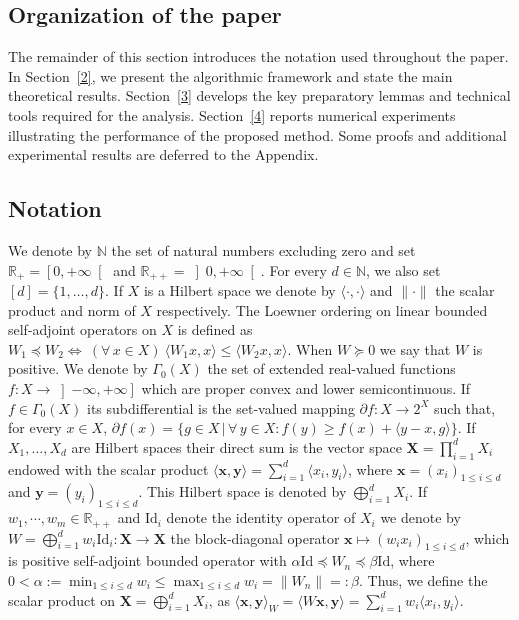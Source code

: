 \documentclass[11pt]{article}
\theoremstyle{plain}
\theoremstyle{definition}
\theoremstyle{remark}
\newcommand{\norm}[1]{\lVert{#1}\rVert}
\newcommand{\scalarp}[1]{\langle{#1}\rangle}
\newcommand{\HH}{X}
\newcommand{\bHH}{\bm{X}}
\newcommand{\R}{\mathbb{R}}
\newcommand{\Sb}{\mathbb{S}}
\newcommand{\x}{x}
\newcommand{\m}{d}
\newcommand{\bx}{\bm{x}}
\newcommand{\by}{\bm{y}}
\newcommand{\y}{y}
\newcommand{\uu}{g}
\newcommand{\w}{w}
\newcommand{\iter}{n}
\newcommand{\N}{\mathbb{N}}
\newcommand{\RX}{\left]-\infty, +\infty\right]}
\newcommand{\Id}{\mathrm{Id}}
\newcommand{\W}{W}
\begin{document}
\subsection{Organization of the paper}

The remainder of this section introduces the notation used throughout the paper. In Section~\ref{2}, we present the algorithmic framework and state the main theoretical results. Section~\ref{3} develops the key preparatory lemmas and technical tools required for the analysis. Section~\ref{4} reports numerical experiments illustrating the performance of the proposed method. Some proofs and additional experimental results are deferred to the Appendix.
\subsection{Notation}

We denote by $\N$ the set of natural numbers excluding zero and set
$\R_+ = \left[0,+\infty\right[$ and $\R_{++} = \left]0,+\infty\right[$.
For every $\m\in \N$, we also set $[\m]= \{1,\dots, \m\}$. If $\HH$
is a Hilbert space we denote by $\scalarp{\cdot, \cdot}$ and $\norm{\cdot}$
the scalar product and norm of $\HH$ respectively. 
The Loewner ordering on linear bounded self-adjoint operators on $\HH$
 is defined as $\W_1 \preceq \W_2 \Leftrightarrow\ (\forall\,\x\in \HH)\ \scalarp{\W_1\x,\x} \leq \scalarp{\W_2\x,\x}$. When $\W\succeq 0$ we say that $\W$ is positive.
We denote by $\Gamma_0(\HH)$ the set of extended real-valued functions
$f\colon \HH\to \RX$ which are proper convex and lower semicontinuous.
If $f\in \Gamma_0(\HH)$ its subdifferential is the set-valued mapping
$\partial f\colon \HH\to 2^\HH$ such that, for every $\x\in \HH$, $\partial f(\x)=\{\uu\in \HH\,\vert\, \forall\,\y\in \HH\colon f(\y)\geq f(\x) + \scalarp{\y-\x, \uu}\}$.
If $\HH_1, \dots, \HH_{\m}$
are Hilbert spaces their direct sum is the vector space $\bHH= \prod_{i=1}^\m \HH_i$  
endowed with the scalar product $\scalarp{\bx, \by} = \sum_{i=1}^\m \scalarp{\x_i, \y_i}$, where
$\bx=(\x_i)_{1\leq i\leq \m}$ and $\by=(\y_i)_{1\leq i\leq \m}$. This Hilbert space is denoted by $\bigoplus_{i=1}^\m \HH_i$. If $\w_1, \cdots, \w_m\in \R_{++}$ and $\Id_i$ denote the identity operator of $\HH_i$ we denote by $\W = \bigoplus_{i=1}^\m \w_i \Id_i\colon \bHH\to \bHH$ the block-diagonal operator $\bx \mapsto (\w_i \x_i)_{1\leq i\leq \m}$, which is positive self-adjoint bounded operator with $\alpha \Id \preceq \W_\iter\preceq \beta\Id$, where $0<\alpha:= \min_{1\leq i\leq \m}\w_i \leq \max_{1\leq i\leq \m}\w_i=\norm{\W_n}=:\beta$. Thus, we define the scalar product on $\bHH= \bigoplus_{i=1}^\m \HH_i$, as
$\scalarp{\bx,\by}_{\W}= \scalarp{\W \bx, \by}=\sum_{i=1}^\m \w_i \scalarp{x_i, y_i}$. 
\end{document}
